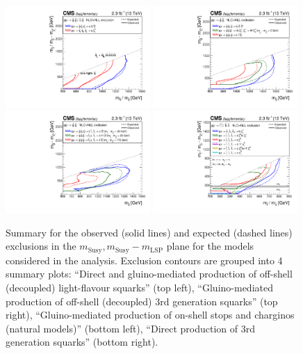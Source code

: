 \clearpage
\begin{figure}[thp!]
  \begin{center}
    \includegraphics[width=0.49\textwidth]{figures/mixSUMMARY_transposed.pdf}
    \includegraphics[width=0.49\textwidth]{figures/gluinoSUMMARY_transposed.pdf} \\
    \includegraphics[width=0.49\textwidth]{figures/naturalSUMMARY_transposed.pdf}
    \includegraphics[width=0.49\textwidth]{figures/allThirdGenSUMMARY_transposed.pdf} \\
    \caption{Summary for the observed (solid lines) and expected (dashed lines) exclusions in the $m_{\mathrm{Susy}},m_{\mathrm{Susy}}-m_{\mathrm{LSP}}$ plane for the models considered in the analysis. 
       Exclusion contours are grouped into 4 summary plots: 
       ``Direct and gluino-mediated production of off-shell (decoupled) light-flavour squarks'' (top left), ``Gluino-mediated production of off-shell (decoupled) 3rd generation squarks'' (top right), ``Gluino-mediated production of on-shell stops and charginos (natural models)'' (bottom left), ``Direct production of 3rd generation squarks'' (bottom right). 
      \label{fig:summary-excl-plots} }
  \end{center}
\end{figure}



\clearpage

